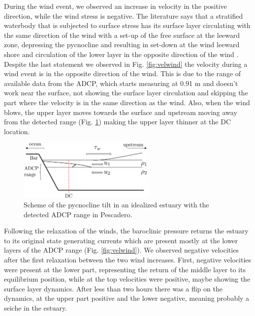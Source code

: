 \documentclass[tesis.tex]{subfiles}
\begin{document}
During the wind event, we observed an increase in velocity in the positive direction, while the wind stress is negative. The literature says that a stratified waterbody that is subjected to surface stress has its surface layer circulating with the same direction of the wind with a set-up of the free surface at the leeward zone, depressing the pycnocline and resulting in set-down at the wind leeward shore and circulation of the lower layer in the opposite direction of the wind \citep{Katopodes2018}. Despite the last statement we observed in Fig. \ref{fig:velwind} the velocity during a wind event is in the opposite direction of the wind. This is due to the range of available data from the ADCP, which starts measuring at 0.91 m and doesn't work near the surface, not showing the surface layer circulation and skipping the part where the velocity is in the same direction as the wind. Also, when the wind blows, the upper layer moves towards the surface and upstream moving away from the detected range (Fig. \ref{fig:adcp}) making the upper layer thinner at the DC location.\\

\begin{figure}[h!]
    \centering
    \includegraphics[width=0.6\textwidth]{Imagenes/ADCP_range.png}
    \caption{Scheme of the pycnocline tilt in an idealized estuary with the detected ADCP range in Pescadero.}
    \label{fig:adcp}
\end{figure}

Following the relaxation of the winds, the baroclinic pressure returns the estuary to its original state generating currents which are present mostly at the lower layers of the ADCP range (Fig. \ref{fig:velwind}). We observed negative velocities after the first relaxation between the two wind increases. First, negative velocities were present at the lower part, representing the return of the middle layer to its equilibrium position, while at the top velocities were positive, maybe showing the surface layer dynamics. After less than two hours there was a flip on the dynamics, at the upper part positive and the lower negative, meaning probably a seiche in the estuary.\\
\end{document}
